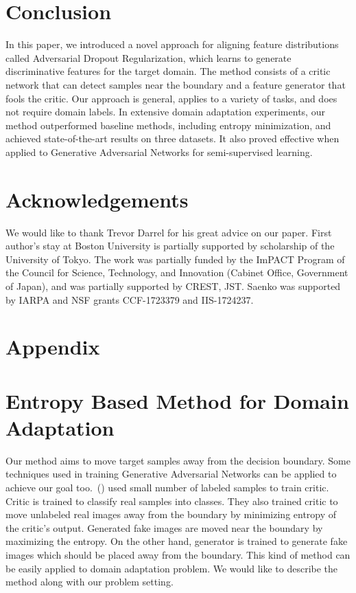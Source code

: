 \documentclass{article} \usepackage{iclr2018_conference,times}
\begin{document}
\vspace{-2mm}        
\section{Conclusion}
\vspace{-3mm}        
In this paper, we introduced a novel approach for aligning feature distributions called Adversarial Dropout Regularization, which learns to generate discriminative features for the target domain. The method consists of a critic network that can detect  samples near the boundary and a feature generator that fools the critic. Our approach is general, applies to a variety of tasks, and does not require domain labels.
In extensive domain adaptation experiments, our method outperformed baseline methods, including entropy minimization, and achieved state-of-the-art results on three datasets. It also proved effective when applied to  Generative Adversarial Networks for semi-supervised learning. 
\section{Acknowledgements}
We would like to thank Trevor Darrel for his great advice on our paper. First author's stay at Boston University is partially supported by scholarship of the University of Tokyo.
The work was partially funded by the ImPACT Program of the Council for Science, Technology, and Innovation
(Cabinet Office, Government of Japan), and was partially supported by CREST, JST. Saenko was supported by IARPA and NSF grants CCF-1723379 and IIS-1724237.




\appendix

\section*{Appendix}
\vspace{-3mm}
\section{Entropy Based Method for Domain Adaptation}
\label{append:ent}
\vspace{-3mm}
Our method aims to move target samples away from the decision boundary. Some techniques used in training Generative Adversarial Networks can be applied to achieve our goal too.~(\cite{springenberg2015unsupervised,salimans2016improved}) used small number of labeled samples to train critic. Critic is trained to classify real samples into  classes. They also trained critic to move unlabeled real images away from the boundary by minimizing entropy of the critic's output. Generated fake images are moved near the boundary by maximizing the entropy. On the other hand, generator is trained to generate fake images which should be placed away from the boundary.
This kind of method can be easily applied to domain adaptation problem. We would like to describe the method along with our problem setting.
\end{document}
